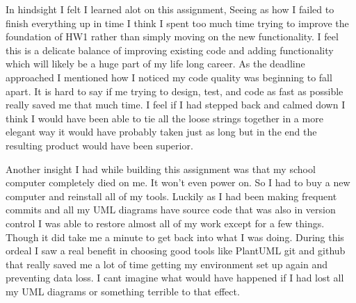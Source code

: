 \documentclass[12pt]{article}
\begin{document}
In hindsight I felt I learned alot on this assignment, Seeing as how I failed to finish everything up in time I think I spent too much time trying to improve the foundation of HW1 rather than simply moving on the new functionality.
I feel this is a delicate balance of improving existing code and adding functionality which will likely be a huge part of my life long career. As the deadline approached I mentioned how I noticed my code quality was beginning to fall apart.
It is hard to say if me trying to design, test, and code as fast as possible really saved me that much time. I feel if I had stepped back and calmed down I think I would have been able to tie all the loose strings together in a more elegant way
it would have probably taken just as long but in the end the resulting product would have been superior.

Another insight I had while building this assignment was that my school computer completely died on me. It won't even power on. So I had to buy a new computer and reinstall all of my tools. Luckily as I had been making frequent commits and all my
UML diagrams have source code that was also in version control I was able to restore almost all of my work except for a few things.
Though it did take me a minute to get back into what I was doing. During this ordeal I saw a real benefit in choosing good tools like PlantUML git and github
that really saved me a lot of time getting my environment set up again and preventing data loss.
I cant imagine what would have happened if I had lost all my UML diagrams or something terrible to that effect.
\end{document}
